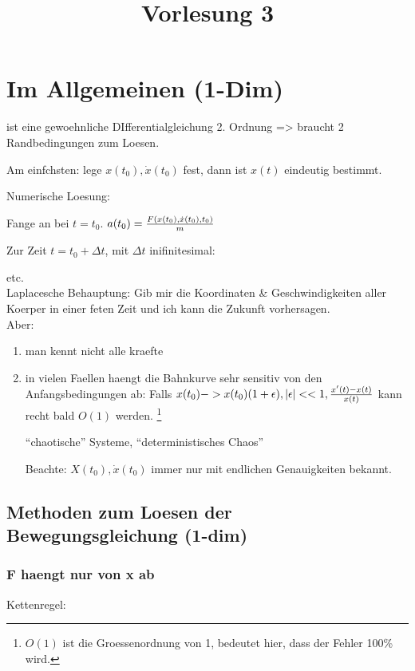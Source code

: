 \documentclass{article}
\begin{document}
\title{Vorlesung 3}

\section{Im Allgemeinen (1-Dim)}


ist eine gewoehnliche DIfferentialgleichung 2. Ordnung => braucht 2 Randbedingungen zum Loesen.

Am einfchsten: lege $x(t_0), \dot x(t_0)$ fest, dann ist $x(t)$ eindeutig bestimmt.

Numerische Loesung:

Fange an bei $t = t_0$. $a(t_0) = {F(x(t_0), \dot x(t_0), t_0) \over m}$

Zur Zeit $t = t_0 + \Delta t$, mit $\Delta t$ inifinitesimal: 

etc.\\


Laplacesche Behauptung:
Gib mir die Koordinaten \& Geschwindigkeiten aller Koerper in einer feten Zeit und ich kann die Zukunft vorhersagen.\\

Aber:
\begin{enumerate}
	\item man kennt nicht alle kraefte
	\item in vielen Faellen haengt die Bahnkurve sehr sensitiv von den Anfangsbedingungen ab:
	Falls $x(t_0) -> x(t_0)(1 + \epsilon), |\epsilon| << 1, {x'(t) - x(t) \over x(t)}$ kann recht bald $O(1)$ werden. \footnote{$O(1)$ ist die Groessenordnung von 1, bedeutet hier, dass der Fehler 100\% wird.}

	 ``chaotische'' Systeme, ``deterministisches Chaos''

	 Beachte: $X(t_0), \dot x(t_0)$ immer nur mit endlichen Genauigkeiten bekannt.
\end{enumerate}

\subsection{Methoden zum Loesen der Bewegungsgleichung (1-dim)}

\subsubsection*{F haengt nur von x ab}
Kettenregel:
\end{document}
